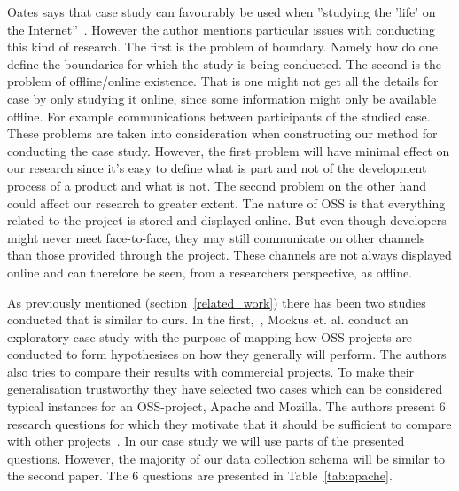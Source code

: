 \documentclass[a4paper,11pt]{article}
\begin{document}
{%
Oates says that case study can favourably be used when ''studying the 'life' on the Internet''~\cite{Oates2005}. However the author mentions particular issues with conducting this kind of research. The first is the problem of boundary. Namely how do one define the boundaries for which the study is being conducted. The second is the problem of offline/online existence. That is one might not get all the details for case by only studying it online, since some information might only be available offline. For example communications between participants of the studied case. These problems are taken into consideration when constructing our method for conducting the case study. However, the first problem will have minimal effect on our research since it's easy to define what is part and not of the development process of a product and what is not. The second problem on the other hand could affect our research to greater extent. The nature of OSS is that everything related to the project is stored and displayed online. But even though developers might never meet face-to-face, they may still communicate on other channels than those provided through the project. These channels are not always displayed online and can therefore be seen, from a researchers perspective, as offline.

As previously mentioned (section~\ref{related_work}) there has been two studies conducted that is similar to ours. In the first,~\cite{Mockus2002a}, Mockus et. al. conduct an exploratory case study with the purpose of mapping how OSS-projects are conducted to form hypothesises on how they generally will perform. The authors also tries to compare their results with commercial projects. To make their generalisation trustworthy they have selected two cases which can be considered typical instances for an OSS-project, Apache and Mozilla. The authors present 6 research questions for which they motivate that it should be sufficient to compare with other projects~\cite{Mockus2002a}. In our case study we will use parts of the presented questions. However, the majority of our data collection schema will be similar to the second paper. The 6 questions are presented in Table~\ref{tab:apache}.

}
\end{document}
